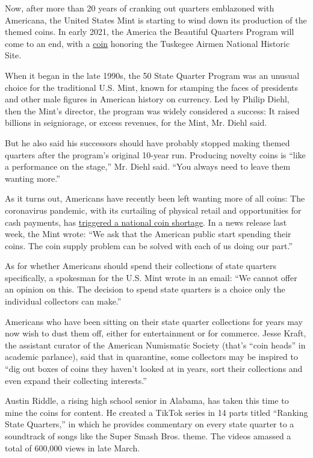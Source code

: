 Now, after more than 20 years of cranking out quarters emblazoned with
Americana, the United States Mint is starting to wind down its
production of the themed coins. In early 2021, the America the Beautiful
Quarters Program will come to an end, with a
\href{https://www.usmint.gov/coins/coin-medal-programs/america-the-beautiful-quarters/tuskegee-airmen-national-historic-site}{coin}
honoring the Tuskegee Airmen National Historic Site.

When it began in the late 1990s, the 50 State Quarter Program was an
unusual choice for the traditional U.S. Mint, known for stamping the
faces of presidents and other male figures in American history on
currency. Led by Philip Diehl, then the Mint's director, the program was
widely considered a success: It raised billions in seigniorage, or
excess revenues, for the Mint, Mr. Diehl said.

But he also said his successors should have probably stopped making
themed quarters after the program's original 10-year run. Producing
novelty coins is ``like a performance on the stage,'' Mr. Diehl said.
``You always need to leave them wanting more.''

As it turns out, Americans have recently been left wanting more of all
coins: The coronavirus pandemic, with its curtailing of physical retail
and opportunities for cash payments, has
\href{https://www.nytimes.com/2020/06/25/business/economy/coin-shortage-coronavirus.html}{triggered
a national coin shortage}. In a news release last week, the Mint wrote:
``We ask that the American public start spending their coins. The coin
supply problem can be solved with each of us doing our part.''

As for whether Americans should spend their collections of state
quarters specifically, a spokesman for the U.S. Mint wrote in an email:
``We cannot offer an opinion on this. The decision to spend state
quarters is a choice only the individual collectors can make.''

Americans who have been sitting on their state quarter collections for
years may now wish to dust them off, either for entertainment or for
commerce. Jesse Kraft, the assistant curator of the American Numismatic
Society (that's ``coin heads'' in academic parlance), said that in
quarantine, some collectors may be inspired to ``dig out boxes of coins
they haven't looked at in years, sort their collections and even expand
their collecting interests.''

Austin Riddle, a rising high school senior in Alabama, has taken this
time to mine the coins for content. He created a TikTok series in 14
parts titled ``Ranking State Quarters,'' in which he provides commentary
on every state quarter to a soundtrack of songs like the Super Smash
Bros. theme. The videos amassed a total of 600,000 views in late March.

